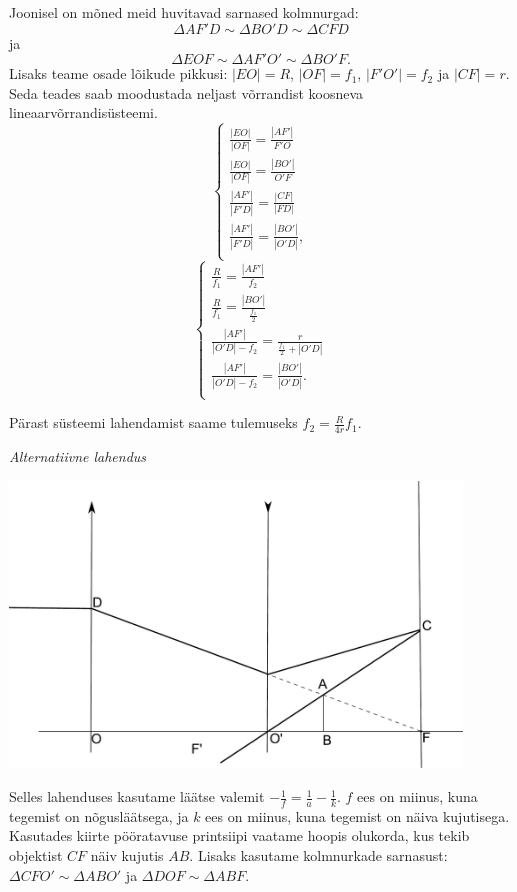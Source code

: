 \documentclass[11pt, twoside]{article}
\begin{document}
{{Joonisel on mõned meid huvitavad sarnased kolmnurgad: $$\Delta AF'D \sim \Delta BO'D \sim \Delta CFD$$ ja $$\Delta EOF \sim \Delta AF'O' \sim \Delta BO'F.$$ Lisaks teame osade lõikude pikkusi: $|EO| = R$, $|OF| = f_1$, $|F'O'| = f_2$ ja $|CF| = r$.
Seda teades saab moodustada neljast võrrandist koosneva lineaarvõrrandisüsteemi.
\[ 
\begin{cases}
\frac{|EO|}{|OF|} = \frac{|AF'|}{F'O}\\
\frac{|EO|}{|OF|} = \frac{|BO'|}{O'F}\\
\frac{|AF'|}{|F'D|} = \frac{|CF|}{|FD|}\\
\frac{|AF'|}{|F'D|} = \frac{|BO'|}{|O'D|},\\
\end{cases}
\]
\[ 
\begin{cases}
\frac{R}{f_1} = \frac{|AF'|}{f_2}\\
\frac{R}{f_1} = \frac{|BO'|}{\frac{f_1}{2}}\\
\frac{|AF'|}{|O'D| - f_2} = \frac{r}{\frac{f_1}{2} + |O'D|}\\
\frac{|AF'|}{|O'D| - f_2} = \frac{|BO'|}{|O'D|}.\\
\end{cases}
\]

Pärast süsteemi lahendamist saame tulemuseks $f_2 = \frac{R}{4r}f_1$. 

\vspace{0.5\baselineskip}
\emph{Alternatiivne lahendus}\\

\begin{center}
	\includegraphics[width=0.9\textwidth]{2013-v3g-01-laats_lah3}\\
\end{center}

Selles lahenduses kasutame läätse valemit $-\frac{1}{f} = \frac{1}{a} - \frac{1}{k}$. $f$ ees on miinus, kuna tegemist on nõgusläätsega, ja $k$ ees on miinus, kuna tegemist on näiva kujutisega. Kasutades kiirte pööratavuse printsiipi vaatame hoopis olukorda, kus tekib objektist $CF$ näiv kujutis $AB$. Lisaks kasutame kolmnurkade sarnasust: $\Delta CFO' \sim \Delta ABO'$ ja $\Delta DOF \sim \Delta ABF$.

}}
\end{document}
